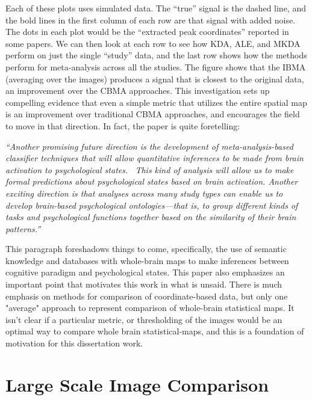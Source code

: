 \documentclass{report}
\begin{document}
Each of these plots uses simulated data. The ``true'' signal is the
dashed line, and the bold lines in the first column of each row are that
signal with added noise. The dots in each plot would be the ``extracted
peak coordinates'' reported in some papers. We can then look at each row
to see how KDA, ALE, and MKDA perform on just the single ``study'' data,
and the last row shows how the methods perform for meta-analysis across
all the studies. The figure shows that the IBMA (averaging over the
images) produces a signal that is closest to the original data, an
improvement over the CBMA approaches. This investigation sets up
compelling evidence that even a simple metric that utilizes the entire
spatial map is an improvement over traditional CBMA approaches, and
encourages the field to move in that direction. In fact, the paper is
quite foretelling:

\textit{``Another promising future direction is the development of
meta-analysis-based classifier techniques that will allow quantitative
inferences to be made from brain activation to psychological states.
~This kind of analysis will allow us to make formal predictions about
psychological states based on brain activation. Another exciting
direction is that analyses across many study types can enable us to
develop brain-based psychological ontologies---that is, to group
different kinds of tasks and psychological functions together based on
the similarity of their brain patterns.''}

This paragraph foreshadows things to come, specifically, the use of
semantic knowledge and databases with whole-brain maps to make
inferences between cognitive paradigm and psychological states. This paper also emphasizes an important point that motivates this work in what is unsaid. There is much emphasis on methods for comparison of coordinate-based data, but only one "average" approach to represent comparison of whole-brain statistical maps.  It isn't clear if a particular metric, or thresholding of the images would be an optimal way to compare whole brain statistical-maps, and this is a foundation of motivation for this dissertation work.

\section{Large Scale Image Comparison}
\end{document}
